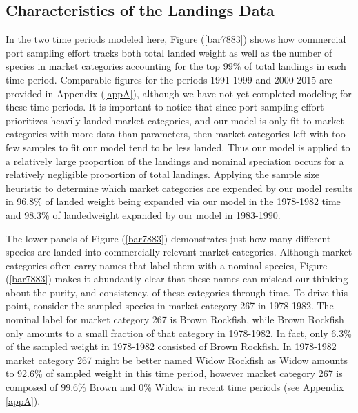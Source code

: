 \documentclass[12pt]{article}
\begin{document}
\subsection{Characteristics of the Landings
Data}\label{characteristics-of-the-landings-data}

In the two time periods modeled here, Figure (\ref{bar7883}) shows
how commercial port sampling effort tracks both total landed weight as
well as the number of species in market categories accounting for the
top 99\% of total landings in each time period. Comparable figures for
the periods 1991-1999 and 2000-2015 are provided in Appendix (\ref{appA}), 
although we have not yet completed modeling for these time periods. It 
is important to notice that since port sampling effort prioritizes 
heavily landed market categories, and our model is only fit to market 
categories with more data than parameters, then market categories left with 
too few samples to fit our model tend to be less landed. Thus our model 
is applied to a relatively large proportion of the landings and 
nominal speciation occurs for a relatively negligible proportion of 
total landings. Applying the sample size heuristic to determine which 
market categories are expended by our model results in 96.8\% of landed 
weight being expanded via our model in the 1978-1982 time and 98.3\% of 
landedweight expanded by our model in 1983-1990.

The lower panels of Figure (\ref{bar7883}) demonstrates just how
many different species are landed into commercially relevant market
categories. Although market categories often carry names that label them
with a nominal species, Figure (\ref{bar7883}) makes it abundantly clear that
these names can mislead our thinking about the purity, and consistency,
of these categories through time. To drive this point, consider the
sampled species in market category 267 in 1978-1982. The nominal label
for market category 267 is Brown Rockfish, while Brown Rockfish only
amounts to a small fraction of that category in 1978-1982. In fact, only
6.3\% of the sampled weight in 1978-1982 consisted of Brown Rockfish. In
1978-1982 market category 267 might be better named Widow Rockfish as
Widow amounts to 92.6\% of sampled weight in this time period, however
market category 267 is composed of 99.6\% Brown and 0\% Widow in recent
time periods (see Appendix \ref{appA}).
\end{document}
